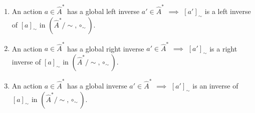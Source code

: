 \begin{propositionE}\label{prp:global_inverse_means_inverse_in_global_algebra}
\begin{enumerate}
    \item An action $a \in \hat{A}^{*}$ has a global left inverse $a' \in \hat{A}^{*}$ $\implies$ $[a']_{\sim}$ is a left inverse of $[a]_{\sim}$ in $(\hat{A}^{*}/\sim, \circ_{\sim})$.
    
    \item An action $a \in \hat{A}^{*}$ has a global right inverse $a' \in \hat{A}^{*}$ $\implies$ $[a']_{\sim}$ is a right inverse of $[a]_{\sim}$ in $(\hat{A}^{*}/\sim, \circ_{\sim})$.

    \item An action $a \in \hat{A}^{*}$ has a global inverse $a' \in \hat{A}^{*}$ $\implies$ $[a']_{\sim}$ is an inverse of $[a]_{\sim}$ in $(\hat{A}^{*}/\sim, \circ_{\sim})$.
\end{enumerate}
\end{propositionE}
